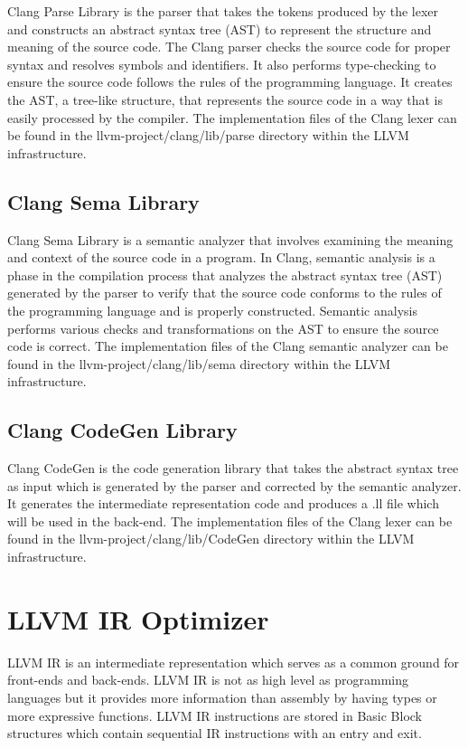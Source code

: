 Clang Parse Library is the parser that takes the tokens produced by the lexer and constructs an abstract syntax tree (AST) to represent the structure and meaning of the source code. The Clang parser checks the source code for proper syntax and resolves symbols and identifiers. It also performs type-checking to ensure the source code follows the rules of the programming language. It creates the AST, a tree-like structure, that represents the source code in a way that is easily processed by the compiler. The implementation files of the Clang lexer can be found in the llvm-project/clang/lib/parse directory within the LLVM infrastructure.

\subsection{Clang Sema Library}

Clang Sema Library is a semantic analyzer that involves examining the meaning and context of the source code in a program. In Clang, semantic analysis is a phase in the compilation process that analyzes the abstract syntax tree (AST) generated by the parser to verify that the source code conforms to the rules of the programming language and is properly constructed. Semantic analysis performs various checks and transformations on the AST to ensure the source code is correct. The implementation files of the Clang semantic analyzer can be found in the llvm-project/clang/lib/sema directory within the LLVM infrastructure.

\subsection{Clang CodeGen Library}

Clang CodeGen is the code generation library that takes the abstract syntax tree as input which is generated by the parser and corrected by the semantic analyzer. It generates the intermediate representation code and produces a .ll file which will be used in the back-end. The implementation files of the Clang lexer can be found in the llvm-project/clang/lib/CodeGen directory within the LLVM infrastructure. 

\section{LLVM IR Optimizer}\label{sec:opt}
LLVM IR is an intermediate representation which serves as a common ground for front-ends and back-ends. LLVM IR is not as high level as programming languages but it provides more information than assembly by having types or more expressive functions. LLVM IR instructions are stored in Basic Block structures which contain sequential IR instructions with an entry and exit. 

